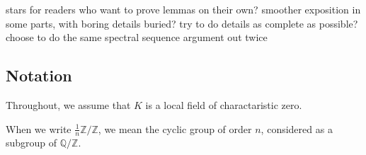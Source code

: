 stars for readers who want to prove lemmas on their own?
smoother exposition in some parts, with boring details buried?
try to do details as complete as possible?
choose to do the same spectral sequence argument out twice

%
%
%

\subsection{Notation}

Throughout, we assume that \(K\) is a local field
of charactaristic zero. 

When we write \(\frac{1}{n}\mathbb{Z} / \mathbb{Z}\), we mean
the cyclic group of order \(n\), considered as a subgroup of
\(\mathbb{Q} / \mathbb{Z}\).

